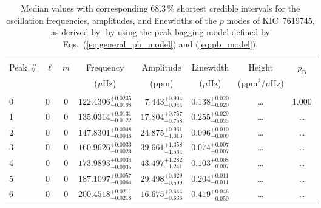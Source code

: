 \begin{table*}[!]
\caption{Median values with corresponding 68.3\,\% shortest credible intervals for the oscillation frequencies, amplitudes, and linewidths of the $p$ modes of KIC~7619745, as derived by \diamonds\,\,by using the peak bagging model defined by Eqs.~(\ref{eq:general_pb_model}) and (\ref{eq:pb_model}).}
\label{tab:7619745p}
\centering
\begin{tabular}{llcrrlrc}
\hline\hline
\\[-8pt]          
Peak \# & $\ell$ & $m$ & \multicolumn{1}{c}{Frequency} & \multicolumn{1}{c}{Amplitude} & \multicolumn{1}{c}{Linewidth} & \multicolumn{1}{c}{Height}& $p_\mathrm{B}$\\
 & & & \multicolumn{1}{c}{($\mu$Hz)} & \multicolumn{1}{c}{(ppm)} & \multicolumn{1}{c}{($\mu$Hz)} & \multicolumn{1}{c}{(ppm$^2/\mu$Hz)}\\
\hline \\[-8pt]
0 & 0 & 0 & $    122.4306_{-      0.0198}^{+      0.0235}$ & $       7.443_{-       0.944}^{+       0.904}$ & $       0.138_{-       0.020}^{+       0.020}$ & \multicolumn{1}{c}{\dots} & 1.000\\[1pt]
1 & 0 & 0 & $    135.0314_{-      0.0122}^{+      0.0131}$ & $      17.804_{-       0.758}^{+       0.757}$ & $       0.255_{-       0.035}^{+       0.029}$ & \multicolumn{1}{c}{\dots} & \dots \\[1pt]
2 & 0 & 0 & $    147.8301_{-      0.0048}^{+      0.0048}$ & $      24.875_{-       1.013}^{+       0.961}$ & $       0.096_{-       0.009}^{+       0.010}$ & \multicolumn{1}{c}{\dots} & \dots \\[1pt]
3 & 0 & 0 & $    160.9626_{-      0.0029}^{+      0.0033}$ & $      39.661_{-       1.564}^{+       1.358}$ & $       0.074_{-       0.007}^{+       0.007}$ & \multicolumn{1}{c}{\dots} & \dots \\[1pt]
4 & 0 & 0 & $    173.9893_{-      0.0035}^{+      0.0034}$ & $      43.497_{-       1.241}^{+       1.282}$ & $       0.103_{-       0.007}^{+       0.008}$ & \multicolumn{1}{c}{\dots} & \dots \\[1pt]
5 & 0 & 0 & $    187.1097_{-      0.0064}^{+      0.0057}$ & $      29.498_{-       0.599}^{+       0.629}$ & $       0.204_{-       0.011}^{+       0.011}$ & \multicolumn{1}{c}{\dots} & \dots \\[1pt]
6 & 0 & 0 & $    200.4518_{-      0.0218}^{+      0.0211}$ & $      16.675_{-       0.636}^{+       0.644}$ & $       0.419_{-       0.050}^{+       0.046}$ & \multicolumn{1}{c}{\dots} & \dots \\[1pt]

\end{tabular}
\end{table*}
